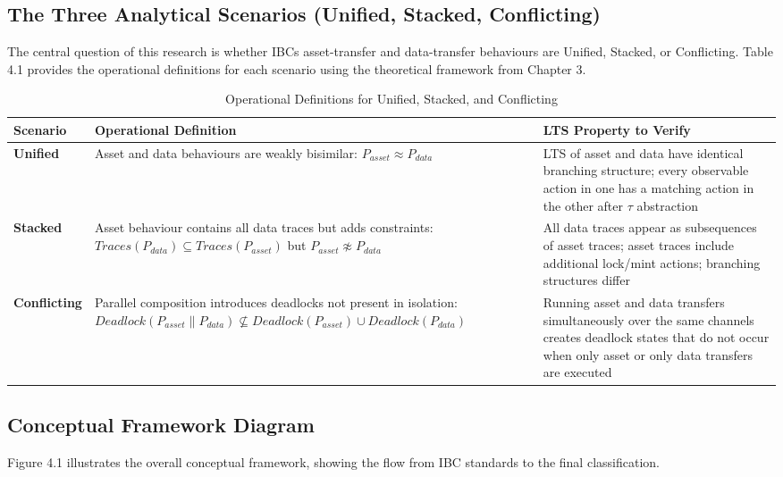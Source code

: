 \subsection{The Three Analytical Scenarios (Unified, Stacked,
Conflicting)}\label{the-three-analytical-scenarios-unified-stacked-conflicting}

The central question of this research is whether IBC\textquotesingle s
asset-transfer and data-transfer behaviours are Unified, Stacked, or
Conflicting. Table 4.1 provides the operational definitions for each
scenario using the theoretical framework from Chapter 3.

\begin{table}[h]
\centering
\begin{tabular}{|p{3cm}|p{5cm}|p{5cm}|}
\hline
\textbf{Scenario} & \textbf{Operational Definition} & \textbf{LTS Property to Verify} \\
\hline
\textbf{Unified} & Asset and data behaviours are weakly bisimilar: \(P_{asset} \approx P_{data}\) & LTS of asset and data have identical branching structure; every observable action in one has a matching action in the other after \(\tau\) abstraction \\
\hline
\textbf{Stacked} & Asset behaviour contains all data traces but adds constraints: \(Traces(P_{data}) \subseteq Traces(P_{asset})\) but \(P_{asset} \not\approx P_{data}\) & All data traces appear as subsequences of asset traces; asset traces include additional lock/mint actions; branching structures differ \\
\hline
\textbf{Conflicting} & Parallel composition introduces deadlocks not present in isolation: \(Deadlock(P_{asset} \parallel P_{data}) \not\subseteq Deadlock(P_{asset}) \cup Deadlock(P_{data})\) & Running asset and data transfers simultaneously over the same channels creates deadlock states that do not occur when only asset or only data transfers are executed \\
\hline
\end{tabular}
\caption{Operational Definitions for Unified, Stacked, and Conflicting}
\end{table}

\subsection{Conceptual Framework
Diagram}\label{conceptual-framework-diagram}

Figure 4.1 illustrates the overall conceptual framework, showing the
flow from IBC standards to the final classification.

